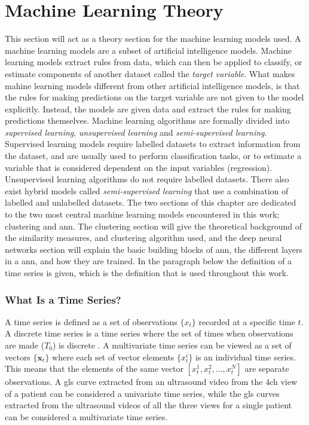 \chapter{Machine Learning Theory} \label{chap:ml}

This section will act as a theory section for the machine learning models used. A machine learning models are a subset of artificial intelligence models. Machine learning models extract rules from data, which can then be applied to classify, or estimate components of another dataset called the \textit{target variable}. What makes mahine learning models different from other artificial intelligence models, is that the rules for making predictions on the target variable are not given to the model explicitly. Instead, the models are given data and extract the rules for making predictions themselves. Machine learning algorithms are formally divided into \textit{supervised learning}, \textit{unsupervised learning} and \textit{semi-supervised learning}. Supervised learning models require labelled datasets to extract information from the dataset, and are usually used to perform classification tasks, or to estimate a variable that is considered dependent on the input variables (regression). Unsupervised learning algorithms do not require labelled datasets. There also exist hybrid models called \textit{semi-supervised learning} that use a combination of labelled and unlabelled datasets. The two sections of this chapter are dedicated to the two most central machine learning models encountered in this work; clustering and \acrshort{ann}. The clustering section will give the theoretical background of the similarity measures, and clustering algorithm used, and the deep neural networks section will explain the basic building blocks of \acrshort{ann}, the different layers in a \acrshort{ann}, and how they are trained. In the paragraph below the definition of a time series is given, which is the definition that is used throughout this work. \bigskip

\subsection*{What Is a Time Series?}
A time series is defined as a set of observations $\{x_t\}$ recorded at a specific time $t$. A discrete time series is a time series where the set of times when observations are made ($T_0$) is discrete \cite{brockwell_davis_advanced}. A multivariate time series can be viewed as a set of vectors $\{\mathbf{x}_t\}$ where each set of vector elements $\{x^i_t\}$ is an individual time series. This means that the elements of the same vector $[x^1_t, x^2_t,...,x^N_t]$ are separate observations. A \acrshort{gls} curve extracted from an ultrasound video from the \acrshort{4ch} view of a patient can be considered a univariate time series, while the \acrshort{gls} curves extracted from the ultrasound videos of all the three views for a single patient can be considered a multivariate time series. \bigskip

